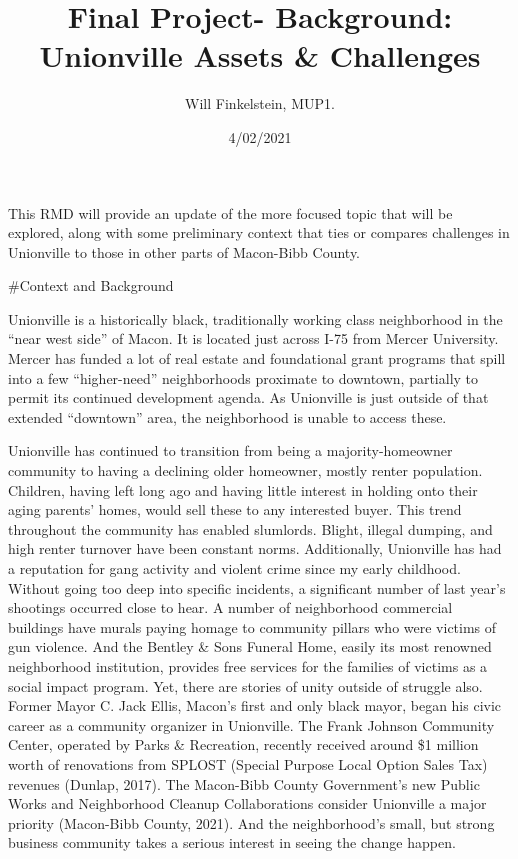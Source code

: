 \documentclass[
]{article}
\title{Final Project- Background: Unionville Assets \& Challenges}
\author{Will Finkelstein, MUP1.}
\date{4/02/2021}
\begin{document}
\maketitle

{
\setcounter{tocdepth}{2}
\tableofcontents
}
This RMD will provide an update of the more focused topic that will be
explored, along with some preliminary context that ties or compares
challenges in Unionville to those in other parts of Macon-Bibb County.

\#Context and Background

Unionville is a historically black, traditionally working class
neighborhood in the ``near west side'' of Macon. It is located just
across I-75 from Mercer University. Mercer has funded a lot of real
estate and foundational grant programs that spill into a few
``higher-need'' neighborhoods proximate to downtown, partially to permit
its continued development agenda. As Unionville is just outside of that
extended ``downtown'' area, the neighborhood is unable to access these.

Unionville has continued to transition from being a majority-homeowner
community to having a declining older homeowner, mostly renter
population. Children, having left long ago and having little interest in
holding onto their aging parents' homes, would sell these to any
interested buyer. This trend throughout the community has enabled
slumlords. Blight, illegal dumping, and high renter turnover have been
constant norms. Additionally, Unionville has had a reputation for gang
activity and violent crime since my early childhood. Without going too
deep into specific incidents, a significant number of last year's
shootings occurred close to hear. A number of neighborhood commercial
buildings have murals paying homage to community pillars who were
victims of gun violence. And the Bentley \& Sons Funeral Home, easily
its most renowned neighborhood institution, provides free services for
the families of victims as a social impact program. Yet, there are
stories of unity outside of struggle also. Former Mayor C. Jack Ellis,
Macon's first and only black mayor, began his civic career as a
community organizer in Unionville. The Frank Johnson Community Center,
operated by Parks \& Recreation, recently received around \$1 million
worth of renovations from SPLOST (Special Purpose Local Option Sales
Tax) revenues (Dunlap, 2017). The Macon-Bibb County Government's new
Public Works and Neighborhood Cleanup Collaborations consider Unionville
a major priority (Macon-Bibb County, 2021). And the neighborhood's
small, but strong business community takes a serious interest in seeing
the change happen.
\end{document}
